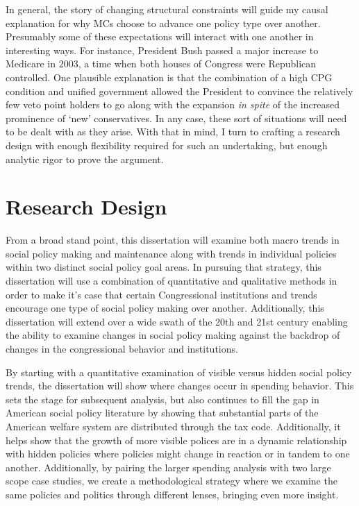 \documentclass[12pt]{article}
\begin{document}
In general, the story of changing structural constraints will guide my causal explanation for why MCs choose to advance one policy type over another. Presumably some of these expectations will interact with one another in interesting ways. For instance, President Bush passed a major increase to Medicare in 2003, a time when both houses of Congress were Republican controlled. One plausible explanation is that the combination of a high CPG condition and unified government allowed the President to convince the relatively few veto point holders to go along with the expansion \emph{in spite} of the increased prominence of `new' conservatives. In any case, these sort of situations will need to be dealt with as they arise. With that in mind, I turn to crafting a research design with enough flexibility required for such an undertaking, but enough analytic rigor to prove the argument.

\section{Research Design}
From a broad stand point, this dissertation will examine both macro trends in social policy making and maintenance along with trends in individual policies within two distinct social policy goal areas. In pursuing that strategy, this dissertation will use a combination of quantitative and qualitative methods in order to make it's case that certain Congressional institutions and trends encourage one type of social policy making over another. Additionally, this dissertation will extend over a wide swath of the 20th and 21st century enabling the ability to examine changes in social policy making against the backdrop of changes in the congressional behavior and institutions.

By starting with a quantitative examination of visible versus hidden social policy trends, the dissertation will show where changes occur in spending behavior. This sets the stage for subsequent analysis, but also continues to fill the gap in American social policy literature by showing that substantial parts of the American welfare system are distributed through the tax code. Additionally, it helps show that the growth of more visible polices are in a dynamic relationship with hidden policies where policies might change in reaction or in tandem to one another. Additionally, by pairing the larger spending analysis with two large scope case studies, we create a methodological strategy where we examine the same policies and politics through different lenses, bringing even more insight.
\end{document}

